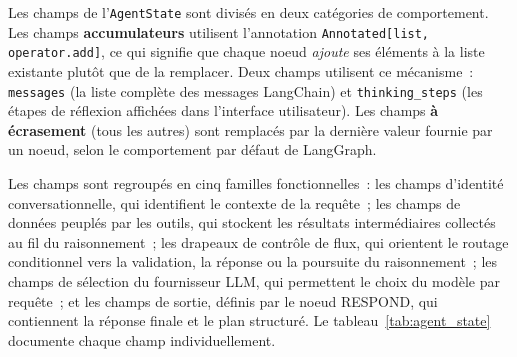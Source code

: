 Les champs de l'\texttt{AgentState} sont divisés en deux catégories de comportement. Les champs
\textbf{accumulateurs} utilisent l'annotation \texttt{Annotated[list, operator.add]}, ce qui
signifie que chaque noeud \emph{ajoute} ses éléments à la liste existante plutôt que de la
remplacer. Deux champs utilisent ce mécanisme~: \texttt{messages} (la liste complète des messages
LangChain) et \texttt{thinking\_steps} (les étapes de réflexion affichées dans l'interface
utilisateur). Les champs \textbf{à écrasement} (tous les autres) sont remplacés par la dernière
valeur fournie par un noeud, selon le comportement par défaut de LangGraph.

Les champs sont regroupés en cinq familles fonctionnelles~: les champs d'identité
conversationnelle, qui identifient le contexte de la requête~; les champs de données peuplés
par les outils, qui stockent les résultats intermédiaires collectés au fil du raisonnement~;
les drapeaux de contrôle de flux, qui orientent le routage conditionnel vers la validation,
la réponse ou la poursuite du raisonnement~; les champs de sélection du fournisseur LLM, qui
permettent le choix du modèle par requête~; et les champs de sortie, définis par le noeud
RESPOND, qui contiennent la réponse finale et le plan structuré. Le tableau~\ref{tab:agent_state}
documente chaque champ individuellement.

